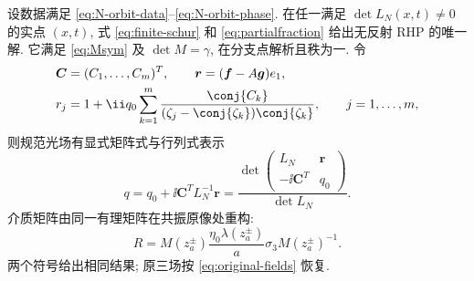 \begin{theorem}[$N$ 轨道矩阵解与行列式重构]\label{thm:N-orbit-RHP}
设数据满足 \eqref{eq:N-orbit-data}--\eqref{eq:N-orbit-phase}. 在任一满足 $\det L_N(x,t)\ne0$ 的实点 $(x,t)$, 式 \eqref{eq:finite-schur} 和 \eqref{eq:partialfraction} 给出无反射 RHP 的唯一解. 它满足 \eqref{eq:Msym} 及 $\det M=\gamma$, 在分支点解析且秩为一. 令
\begin{equation}\label{eq:N-rhs}
\begin{aligned}
&\boldsymbol C=(C_1,\ldots,C_m)^T,\qquad
\boldsymbol r=(\boldsymbol f-A\boldsymbol g)e_1,\\
&r_j=1+\ii q_0\sum\limits_{k=1}^{m}
\dfrac{\conj{C_k}}{(\zeta_j-\conj{\zeta_k})\conj{\zeta_k}},\qquad j=1,\ldots,m,
\end{aligned}
\end{equation}
则规范光场有显式矩阵式与行列式表示
\begin{equation}\label{eq:N-determinant-q}
q=q_0+\ii\boldsymbol C^T L_N^{-1}\boldsymbol r
=\dfrac{\det\begin{pmatrix}L_N&\boldsymbol r\\-\ii\boldsymbol C^T&q_0\end{pmatrix}}
{\det L_N}.
\end{equation}
介质矩阵由同一有理矩阵在共振原像处重构:
\begin{equation}\label{eq:N-medium}
R=M(z_a^\pm)\dfrac{\eta_0\lambda(z_a^\pm)}{a}\sigma_3 M(z_a^\pm)^{-1}.
\end{equation}
两个符号给出相同结果; 原三场按 \eqref{eq:original-fields} 恢复.
\end{theorem}

